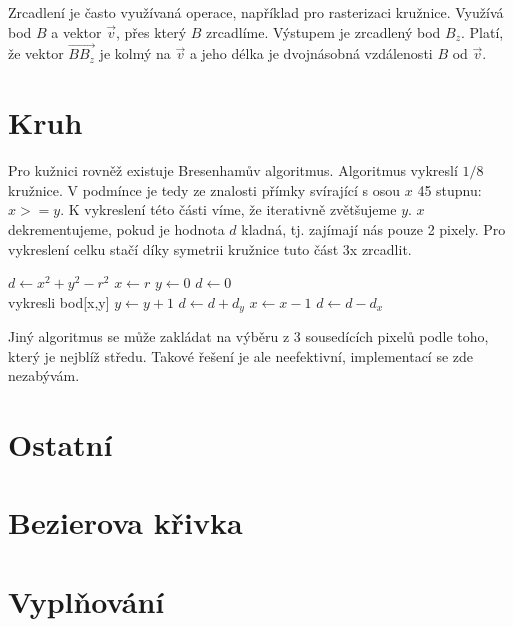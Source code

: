 \documentclass[a4paper,12pt]{book}
\begin{document}
Zrcadlení je často využívaná operace, například pro rasterizaci kružnice.
Využívá bod $B$ a vektor $\vec{v}$, přes který $B$ zrcadlíme. Výstupem je zrcadlený bod $B_{z}$.
Platí, že vektor $\overrightarrow{BB_{z}}$ je kolmý na $\vec{v}$ a jeho délka je dvojnásobná vzdálenosti $B$ od $\vec{v}$.








\section{Kruh} %

Pro kužnici rovněž existuje Bresenhamův algoritmus. Algoritmus vykreslí $1/8$ kružnice. V podmínce je tedy ze znalosti přímky svírající s osou $x$ 45 stupnu: $x>=y$. K vykreslení této části víme, že iterativně zvětšujeme $y$. $x$ dekrementujeme, pokud je hodnota $d$ kladná, tj. zajímají nás pouze 2 pixely. %
Pro vykreslení celku stačí díky symetrii kružnice tuto část 3x zrcadlit.




\begin{algorithmic}
\State $d \gets x^2 + y^2 - r^2$
\State $x \gets r$
\State $y \gets 0$
\State $d \gets 0$
\\vykresli bod[x,y]
\State $y \gets y + 1$
\State $d \gets d + d_y$
    \State $x \gets x - 1$
    \State $d \gets d - d_x$
\EndIf 
\EndWhile
\end{algorithmic}

Jiný algoritmus se může zakládat na výběru z 3 sousedících pixelů podle toho, který je nejblíž středu. Takové řešení je ale neefektivní, implementací se zde nezabývám.






\section{Ostatní}

\section{Bezierova křivka}

\section{Vyplňování} %
\end{document}
